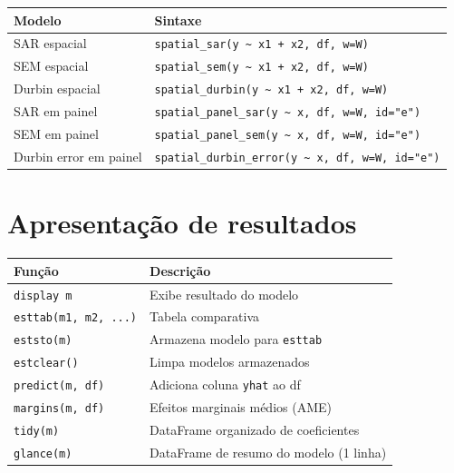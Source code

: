 \begin{center}
\begin{tabular}{ll}
\toprule
\textbf{Modelo} & \textbf{Sintaxe} \\
\midrule
SAR espacial\textdagger{}         & \texttt{spatial\_sar(y \textasciitilde{} x1 + x2, df, w=W)} \\
SEM espacial\textdagger{}         & \texttt{spatial\_sem(y \textasciitilde{} x1 + x2, df, w=W)} \\
Durbin espacial\textdagger{}      & \texttt{spatial\_durbin(y \textasciitilde{} x1 + x2, df, w=W)} \\
SAR em painel\textdagger{}        & \texttt{spatial\_panel\_sar(y \textasciitilde{} x, df, w=W, id="e")} \\
SEM em painel\textdagger{}        & \texttt{spatial\_panel\_sem(y \textasciitilde{} x, df, w=W, id="e")} \\
Durbin error em painel\textdagger{} & \texttt{spatial\_durbin\_error(y \textasciitilde{} x, df, w=W, id="e")} \\
\bottomrule
\end{tabular}
\end{center}

\section{Apresentação de resultados}

\begin{center}
\begin{tabular}{ll}
\toprule
\textbf{Função} & \textbf{Descrição} \\
\midrule
\texttt{display m}             & Exibe resultado do modelo \\
\texttt{esttab(m1, m2, ...)}   & Tabela comparativa \\
\texttt{eststo(m)}             & Armazena modelo para \texttt{esttab} \\
\texttt{estclear()}            & Limpa modelos armazenados \\
\texttt{predict(m, df)}        & Adiciona coluna \texttt{yhat} ao df \\
\texttt{margins(m, df)}        & Efeitos marginais médios (AME) \\
\texttt{tidy(m)}               & DataFrame organizado de coeficientes \\
\texttt{glance(m)}              & DataFrame de resumo do modelo (1 linha) \\
\bottomrule
\end{tabular}
\end{center}

